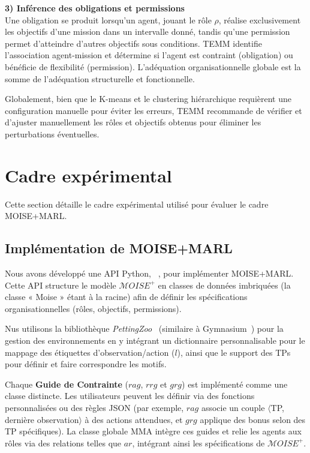 \documentclass[dissemination]{jfsma}
\begin{document}
\noindent\textbf{3) Inférence des obligations et permissions} \\
Une obligation se produit lorsqu'un agent, jouant le rôle \(\rho\), réalise exclusivement les objectifs d'une mission dans un intervalle donné, tandis qu'une permission permet d'atteindre d'autres objectifs sous conditions. TEMM identifie l'association agent-mission et détermine si l'agent est contraint (obligation) ou bénéficie de flexibilité (permission). L'adéquation organisationnelle globale est la somme de l'adéquation structurelle et fonctionnelle.

Globalement, bien que le K-means et le clustering hiérarchique requièrent une configuration manuelle pour éviter les erreurs, TEMM recommande de vérifier et d'ajuster manuellement les rôles et objectifs obtenus pour éliminer les perturbations éventuelles.


\section{Cadre expérimental}
\label{sec:experimental_setup}

Cette section détaille le cadre expérimental utilisé pour évaluer le cadre MOISE+MARL.

\subsection{Implémentation de MOISE+MARL}

Nous avons développé une API Python, ~\hyperref[fn:github]{\footnotemark[1]}, pour implémenter MOISE+MARL. Cette API structure le modèle \(\mathcal{M}OISE^+\) en classes de données imbriquées (la classe « Moise » étant à la racine) afin de définir les spécifications organisationnelles (rôles, objectifs, permissions).

Nus utilisons la bibliothèque \textit{PettingZoo}~\cite{terry2020pettingzoo} (similaire à Gymnasium~\cite{kwiatkowski2024}) pour la gestion des environnements en y intégrant un dictionnaire personnalisable pour le mappage des étiquettes d'observation/action (\(l\)), ainsi que le support des TPs pour définir et faire correspondre les motifs.

Chaque \textbf{Guide de Contrainte} (\(rag\), \(rrg\) et \(grg\)) est implémenté comme une classe distincte. Les utilisateurs peuvent les définir via des fonctions personnalisées ou des règles JSON (par exemple, \(rag\) associe un couple \(\langle\)TP, dernière observation\(\rangle\) à des actions attendues, et \(grg\) applique des bonus selon des TP spécifiques). La classe globale MMA intègre ces guides et relie les agents aux rôles via des relations telles que \(ar\), intégrant ainsi les spécifications de \(\mathcal{M}OISE^+\).
\end{document}
